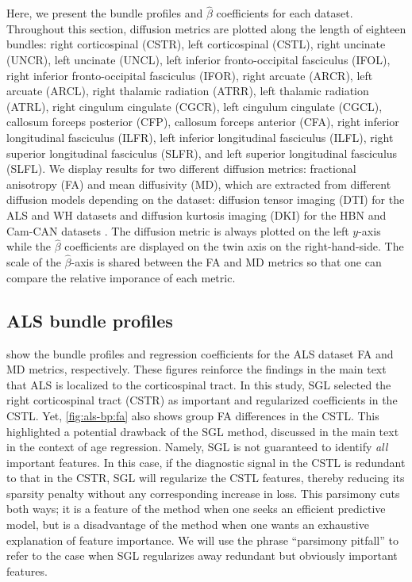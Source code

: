 \documentclass[10pt,letterpaper]{article}
\begin{document}
Here, we present the bundle profiles and $\hat{\beta}$ coefficients
for each dataset. Throughout this section, diffusion metrics are plotted
along the length of eighteen bundles:
right corticospinal (CSTR),
left corticospinal (CSTL),
right uncinate (UNCR),
left uncinate (UNCL),
left inferior fronto-occipital fasciculus (IFOL),
right inferior fronto-occipital fasciculus (IFOR),
right arcuate (ARCR),
left arcuate (ARCL),
right thalamic radiation (ATRR),
left thalamic radiation (ATRL),
right cingulum cingulate (CGCR),
left cingulum cingulate (CGCL),
callosum forceps posterior (CFP),
callosum forceps anterior (CFA),
right inferior longitudinal fasciculus (ILFR),
left inferior longitudinal fasciculus (ILFL),
right superior longitudinal fasciculus (SLFR),
and left superior longitudinal fasciculus (SLFL).
We display results for two different diffusion metrics: fractional anisotropy
(FA) and mean diffusivity (MD), which are extracted from different diffusion
models depending on the dataset: diffusion tensor imaging (DTI) for the ALS
and WH datasets and diffusion kurtosis imaging (DKI) for the HBN and Cam-CAN
datasets \cite{jensen2005diffusion}. The diffusion metric is always plotted
on the left $y$-axis while the $\hat{\beta}$ coefficients are displayed on
the twin axis on the right-hand-side. The scale of the $\hat{\beta}$-axis is
shared between the FA and MD metrics so that one can compare the relative
imporance of each metric.

\subsection{ALS bundle profiles}

 show the bundle profiles and regression
coefficients for the ALS dataset FA and MD metrics, respectively. These
figures reinforce the findings in the main text that ALS is localized to the
corticospinal tract. In this study, SGL selected the right corticospinal
tract (CSTR) as important and regularized coefficients in the CSTL. Yet,
\cref{fig:als-bp:fa} also shows group FA differences in the CSTL. This
highlighted a potential drawback of the SGL method, discussed in the main
text in the context of age regression. Namely, SGL is not guaranteed to
identify \emph{all} important features. In this case, if the diagnostic
signal in the CSTL is redundant to that in the CSTR, SGL will regularize the
CSTL features, thereby reducing its sparsity penalty without any
corresponding increase in loss. This parsimony cuts both ways; it is a
feature of the method when one seeks an efficient predictive model, but is a
disadvantage of the method when one wants an exhaustive explanation of feature
importance. We will use the phrase ``parsimony pitfall'' to refer to the
case when SGL regularizes away redundant but obviously important features.
\end{document}
